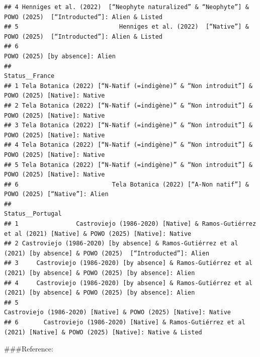 \documentclass[
]{article}
\begin{document}
\begin{verbatim}
## 4 Henniges et al. (2022)  [“Neophyte naturalized” & “Neophyte”] & POWO (2025)  [“Introducted”]: Alien & Listed
## 5                            Henniges et al. (2022)  [“Native”] & POWO (2025)  [“Introducted”]: Alien & Listed
## 6                                                                              POWO (2025) [by absence]: Alien
##                                                                                  Status__France
## 1 Tela Botanica (2022) [“N-Natif (=indigène)” & “Non introduit”] & POWO (2025) [Native]: Native
## 2 Tela Botanica (2022) [“N-Natif (=indigène)” & “Non introduit”] & POWO (2025) [Native]: Native
## 3 Tela Botanica (2022) [“N-Natif (=indigène)” & “Non introduit”] & POWO (2025) [Native]: Native
## 4 Tela Botanica (2022) [“N-Natif (=indigène)” & “Non introduit”] & POWO (2025) [Native]: Native
## 5 Tela Botanica (2022) [“N-Natif (=indigène)” & “Non introduit”] & POWO (2025) [Native]: Native
## 6                          Tela Botanica (2022) [“A-Non natif”] & POWO (2025) [“Native”]: Alien
##                                                                                                         Status__Portugal
## 1                Castroviejo (1986-2020) [Native] & Ramos-Gutiérrez et al (2021) [Native] & POWO (2025) [Native]: Native
## 2 Castroviejo (1986-2020) [by absence] & Ramos-Gutiérrez et al (2021) [by absence] & POWO (2025)  [“Introducted”]: Alien
## 3     Castroviejo (1986-2020) [by absence] & Ramos-Gutiérrez et al (2021) [by absence] & POWO (2025) [by absence]: Alien
## 4     Castroviejo (1986-2020) [by absence] & Ramos-Gutiérrez et al (2021) [by absence] & POWO (2025) [by absence]: Alien
## 5                                                        Castroviejo (1986-2020) [Native] & POWO (2025) [Native]: Native
## 6       Castroviejo (1986-2020) [Native] & Ramos-Gutiérrez et al (2021) [Native] & POWO (2025) [Native]: Native & Listed
\end{verbatim}

\#\#\#Reference:
\end{document}
